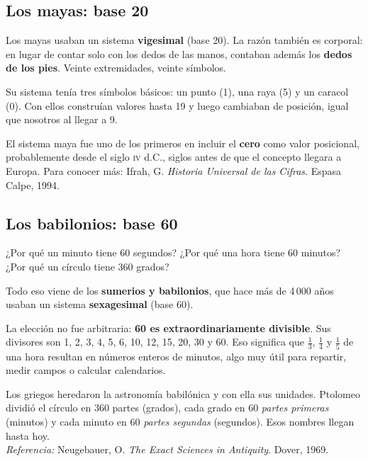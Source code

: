 \documentclass[12pt, oneside]{article}
\begin{document}
\subsection{Los mayas: base 20}

Los mayas usaban un sistema \textbf{vigesimal} (base 20).
La razón también es corporal: en lugar de contar solo con los dedos de las
manos, contaban además los \textbf{dedos de los pies}. Veinte extremidades,
veinte símbolos.

Su sistema tenía tres símbolos básicos: un punto (1), una raya (5) y un
caracol (0). Con ellos construían valores hasta 19 y luego cambiaban de
posición, igual que nosotros al llegar a 9.

\begin{tecnico}
  El sistema maya fue uno de los primeros en incluir el \textbf{cero} como
  valor posicional, probablemente desde el siglo \textsc{iv} d.C.,
  siglos antes de que el concepto llegara a Europa.
  Para conocer más: Ifrah, G. \textit{Historia Universal de las Cifras}.
  Espasa Calpe, 1994.
\end{tecnico}

\subsection{Los babilonios: base 60}

¿Por qué un minuto tiene 60 segundos? ¿Por qué una hora tiene 60 minutos?
¿Por qué un círculo tiene 360 grados?

Todo eso viene de los \textbf{sumerios y babilonios}, que hace más de
4\,000 años usaban un sistema \textbf{sexagesimal} (base 60).

La elección no fue arbitraria: \textbf{60 es extraordinariamente divisible}.
Sus divisores son 1, 2, 3, 4, 5, 6, 10, 12, 15, 20, 30 y 60.
Eso significa que $\frac{1}{3}$, $\frac{1}{4}$ y $\frac{1}{5}$ de una hora
resultan en números enteros de minutos, algo muy útil para repartir, medir
campos o calcular calendarios.

\begin{consejo}
  Los griegos heredaron la astronomía babilónica y con ella sus unidades.
  Ptolomeo dividió el círculo en 360 partes (grados), cada grado en
  60 \textit{partes primeras} (minutos) y cada minuto en 60
  \textit{partes segundas} (segundos). Esos nombres llegan hasta hoy.\\
  \textit{Referencia:} Neugebauer, O. \textit{The Exact Sciences in Antiquity}.
  Dover, 1969.
\end{consejo}
\end{document}
